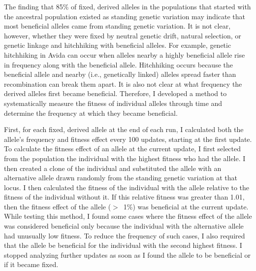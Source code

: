 \begin{doublespace}
The finding that 85\% of fixed, derived alleles
in the populations that started with the ancestral population
existed as standing genetic variation
may indicate that most beneficial alleles came from standing genetic variation.
%
It is not clear, however, whether they were fixed
by neutral genetic drift, natural selection,
or genetic linkage and hitchhiking with beneficial alleles.
%
For example, genetic hitchhiking in Avida can occur
when alleles nearby a highly beneficial allele
rise in frequency along with the beneficial allele.
%
Hitchhiking occurs because the beneficial allele
and nearby (i.e., genetically linked) alleles
spread faster than recombination can break them apart.
%
It is also not clear at what frequency
the derived alleles first became beneficial.
%
Therefore, I developed a method to systematically
measure the fitness of individual alleles through time
and determine the frequency at which they became beneficial.





First, for each fixed, derived allele at the end of each run,
I calculated both the allele's frequency and fitness effect
every 100 updates, starting at the first update.
%
To calculate the fitness effect of an allele at the current update,
I first selected from the population the individual
with the highest fitness who had the allele.
%
I then created a clone of the individual and
substituted the allele with an alternative allele
drawn randomly from the standing genetic variation at that locus.
%
I then calculated the fitness of the individual with the allele
relative to the fitness of the individual without it.
%
If this relative fitness was greater than 1.01,
then the fitness effect of the allele ($>$~1\%)
was beneficial at the current update.
%
While testing this method, I found some cases where
the fitness effect of the allele was considered beneficial
only because the individual with the alternative allele
had unusually low fitness.
%
To reduce the frequency of such cases,
I also required that the allele be beneficial
for the individual with the second highest fitness.
%
I stopped analyzing further updates
as soon as I found the allele to be beneficial
or if it became fixed.



\end{doublespace}

